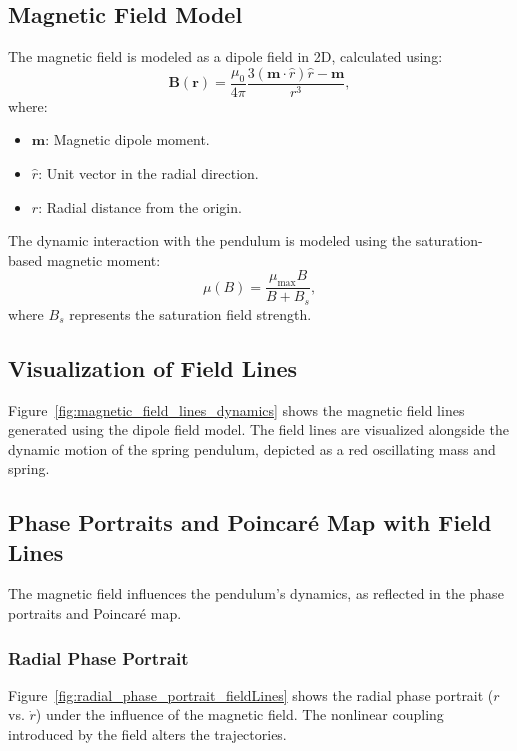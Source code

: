 \documentclass[12pt]{article}
\begin{document}
\subsection{Magnetic Field Model}
The magnetic field is modeled as a dipole field in 2D, calculated using:
\[
\mathbf{B}(\mathbf{r}) = \frac{\mu_0}{4\pi} \frac{3(\mathbf{m} \cdot \hat{r}) \hat{r} - \mathbf{m}}{r^3},
\]
where:
\begin{itemize}
    \item \( \mathbf{m} \): Magnetic dipole moment.
    \item \( \hat{r} \): Unit vector in the radial direction.
    \item \( r \): Radial distance from the origin.
\end{itemize}
The dynamic interaction with the pendulum is modeled using the saturation-based magnetic moment:
\[
\mu(B) = \frac{\mu_{\text{max}} B}{B + B_s},
\]
where \( B_s \) represents the saturation field strength.

\subsection{Visualization of Field Lines}
Figure~\ref{fig:magnetic_field_lines_dynamics} shows the magnetic field lines generated using the dipole field model. The field lines are visualized alongside the dynamic motion of the spring pendulum, depicted as a red oscillating mass and spring.

\subsection{Phase Portraits and Poincaré Map with Field Lines}
The magnetic field influences the pendulum's dynamics, as reflected in the phase portraits and Poincaré map.

\subsubsection{Radial Phase Portrait}
Figure~\ref{fig:radial_phase_portrait_fieldLines} shows the radial phase portrait (\( r \) vs. \( \dot{r} \)) under the influence of the magnetic field. The nonlinear coupling introduced by the field alters the trajectories.
\end{document}
